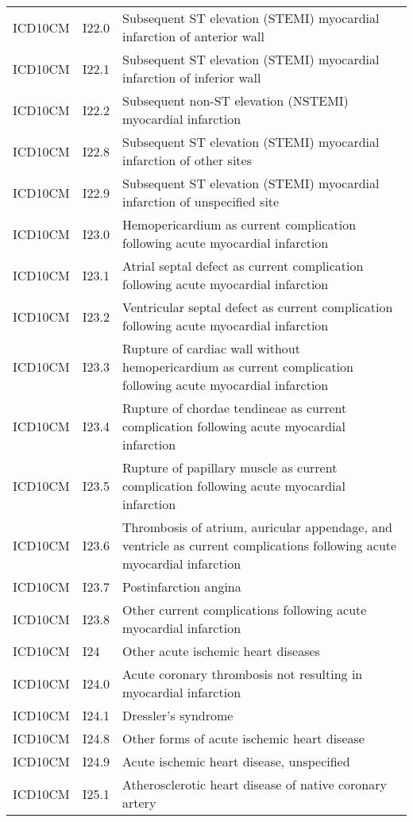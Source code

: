 \begin{longtable}{p{}p{}p{}}
  ICD10CM & I22.0 & Subsequent ST elevation (STEMI) myocardial infarction of anterior wall \\ 
  ICD10CM & I22.1 & Subsequent ST elevation (STEMI) myocardial infarction of inferior wall \\ 
  ICD10CM & I22.2 & Subsequent non-ST elevation (NSTEMI) myocardial infarction \\ 
  ICD10CM & I22.8 & Subsequent ST elevation (STEMI) myocardial infarction of other sites \\ 
  ICD10CM & I22.9 & Subsequent ST elevation (STEMI) myocardial infarction of unspecified site \\ 
  ICD10CM & I23.0 & Hemopericardium as current complication following acute myocardial infarction \\ 
  ICD10CM & I23.1 & Atrial septal defect as current complication following acute myocardial infarction \\ 
  ICD10CM & I23.2 & Ventricular septal defect as current complication following acute myocardial infarction \\ 
  ICD10CM & I23.3 & Rupture of cardiac wall without hemopericardium as current complication following acute myocardial infarction \\ 
  ICD10CM & I23.4 & Rupture of chordae tendineae as current complication following acute myocardial infarction \\ 
  ICD10CM & I23.5 & Rupture of papillary muscle as current complication following acute myocardial infarction \\ 
  ICD10CM & I23.6 & Thrombosis of atrium, auricular appendage, and ventricle as current complications following acute myocardial infarction \\ 
  ICD10CM & I23.7 & Postinfarction angina \\ 
  ICD10CM & I23.8 & Other current complications following acute myocardial infarction \\ 
  ICD10CM & I24 & Other acute ischemic heart diseases \\ 
  ICD10CM & I24.0 & Acute coronary thrombosis not resulting in myocardial infarction \\ 
  ICD10CM & I24.1 & Dressler's syndrome \\ 
  ICD10CM & I24.8 & Other forms of acute ischemic heart disease \\ 
  ICD10CM & I24.9 & Acute ischemic heart disease, unspecified \\ 
  ICD10CM & I25.1 & Atherosclerotic heart disease of native coronary artery \\ 

\end{longtable}

